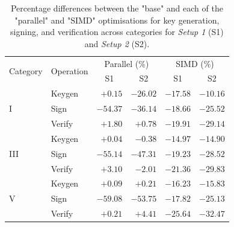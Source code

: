 \documentclass[11pt]{report}
\theoremstyle{definition}
\theoremstyle{plain}
\begin{document}
\begin{table}[H]
  \centering
  \begin{tabular}{l|l|rr|rr}
    \hline
    \multirow{2}{*}{Category} & \multirow{2}{*}{Operation} & \multicolumn{2}{c|}{Parallel (\%)} & \multicolumn{2}{c}{SIMD (\%)}                                                   \\
                              &                            & \multicolumn{1}{c}{S1}             & \multicolumn{1}{c}{S2}        & \multicolumn{1}{c}{S1} & \multicolumn{1}{c}{S2} \\
    \hline
    \multirow{3}{*}{I}
                              & Keygen                     & $+0.15$                            & $-26.02$                      & $-17.58$               & $-10.16$               \\
                              & Sign                       & $-54.37$                           & $-36.14$                      & $-18.66$               & $-25.52$               \\
                              & Verify                     & $+1.80$                            & $+0.78$                       & $-19.91$               & $-29.14$               \\
    \hline
    \multirow{3}{*}{III}
                              & Keygen                     & $+0.04$                            & $-0.38$                       & $-14.97$               & $-14.90$               \\
                              & Sign                       & $-55.14$                           & $-47.31$                      & $-19.23$               & $-28.52$               \\
                              & Verify                     & $+3.10$                            & $-2.01$                       & $-21.36$               & $-29.83$               \\
    \hline
    \multirow{3}{*}{V}
                              & Keygen                     & $+0.09$                            & $+0.21$                       & $-16.23$               & $-15.83$               \\
                              & Sign                       & $-59.08$                           & $-53.75$                      & $-17.82$               & $-25.13$               \\
                              & Verify                     & $+0.21$                            & $+4.41$                       & $-25.64$               & $-32.47$               \\
    \hline
  \end{tabular}
  \caption{Percentage differences between the "base" and each of the "parallel" and "SIMD" optimisations for key generation, signing, and verification across categories for \textit{Setup 1} (S1) and \textit{Setup 2} (S2).}
  \label{tab:base_vs_parallel_simd_s1_s2}
\end{table}
\end{document}
